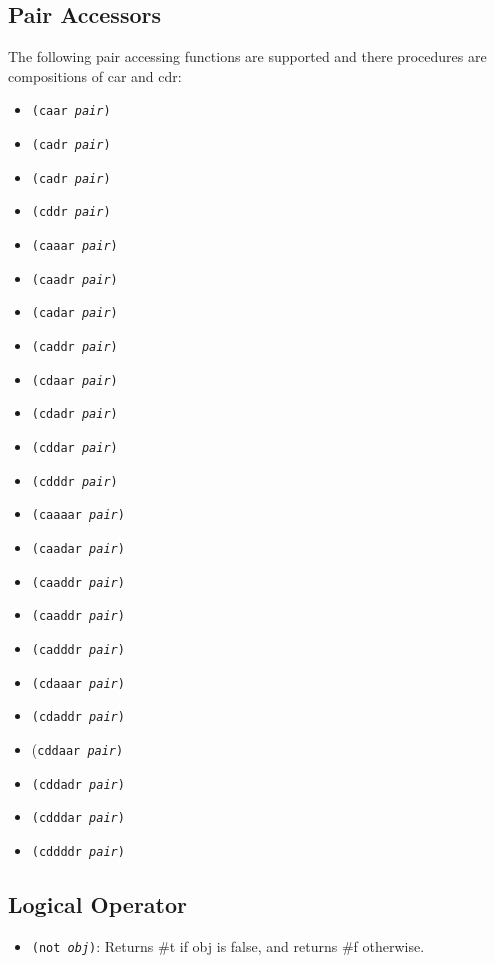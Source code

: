 \documentclass{article}
\begin{document}
\subsection*{Pair Accessors}
The following pair accessing functions are supported and there procedures are compositions of car and cdr:
\begin{itemize}
\item \texttt{(caar \textit{pair})}
\item \texttt{(cadr \textit{pair})}
\item \texttt{(cadr \textit{pair})}
\item \texttt{(cddr \textit{pair})}
\item \texttt{(caaar \textit{pair})}
\item \texttt{(caadr \textit{pair})}
\item \texttt{(cadar \textit{pair})}
\item \texttt{(caddr \textit{pair})}
\item \texttt{(cdaar \textit{pair})}
\item \texttt{(cdadr \textit{pair})}
\item \texttt{(cddar \textit{pair})}
\item \texttt{(cdddr \textit{pair})}
\item \texttt{(caaaar \textit{pair})}
\item \texttt{(caadar \textit{pair})}
\item \texttt{(caaddr \textit{pair})}
\item \texttt{(caaddr \textit{pair})}
\item \texttt{(cadddr \textit{pair})}
\item \texttt{(cdaaar \textit{pair})}
\item \texttt{(cdaddr \textit{pair})}
\item (\texttt{cddaar \textit{pair})}
\item \texttt{(cddadr \textit{pair})}
\item \texttt{(cdddar \textit{pair})}
\item \texttt{(cddddr \textit{pair})}
\end{itemize}
\subsection*{Logical Operator}
\begin{itemize}
\item \texttt{(not \textit{obj})}: Returns \#t if obj is false, and returns \#f otherwise.
\end{itemize}
\end{document}
